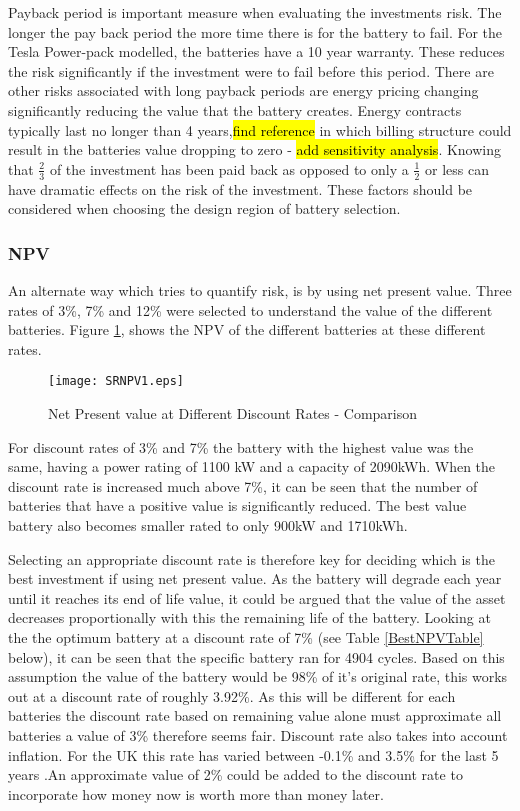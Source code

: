 Payback period is important measure when evaluating the investments
risk. The longer the pay back period the more time there is for the
battery to fail. For the Tesla Power-pack modelled, the batteries have a
10 year warranty. These reduces the risk significantly if the investment
were to fail before this period. There are other risks associated with
long payback periods are energy pricing changing significantly reducing
the value that the battery creates. Energy contracts typically last no
longer than 4 years,\hl{find reference} in which billing structure could
result in the batteries value dropping to zero -
\hl{add sensitivity analysis}. Knowing that \(\frac{2}{3}\) of the
investment has been paid back as opposed to only a \(\frac{1}{2}\) or
less can have dramatic effects on the risk of the investment. These
factors should be considered when choosing the design region of battery
selection.

\subsubsection{NPV}\label{npv}

An alternate way which tries to quantify risk, is by using net present
value. Three rates of 3\%, 7\% and 12\% were selected to understand the
value of the different batteries. Figure \ref{SRNPV1}, shows the NPV of
the different batteries at these different rates.

\begin{figure}[H]
 \centering
 \texttt{[image: SRNPV1.eps]}
 \caption{Net Present value at Different Discount Rates - Comparison}
 \label{SRNPV1}
\end{figure}

For discount rates of 3\% and 7\% the battery with the highest value was
the same, having a power rating of 1100 kW and a capacity of 2090kWh.
When the discount rate is increased much above 7\%, it can be seen that
the number of batteries that have a positive value is significantly
reduced. The best value battery also becomes smaller rated to only 900kW
and 1710kWh.

Selecting an appropriate discount rate is therefore key for deciding
which is the best investment if using net present value. As the battery
will degrade each year until it reaches its end of life value, it could
be argued that the value of the asset decreases proportionally with this
the remaining life of the battery. Looking at the the optimum battery at
a discount rate of 7\% (see Table \ref{BestNPVTable} below), it can be
seen that the specific battery ran for 4904 cycles. Based on this
assumption the value of the battery would be 98\% of it's original rate,
this works out at a discount rate of roughly 3.92\%. As this will be
different for each batteries the discount rate based on remaining value
alone must approximate all batteries a value of 3\% therefore seems
fair. Discount rate also takes into account inflation. For the UK this
rate has varied between -0.1\% and 3.5\% for the last 5 years
\cite{UnitedKi95:online}.An approximate value of 2\% could be added to
the discount rate to incorporate how money now is worth more than money
later.

